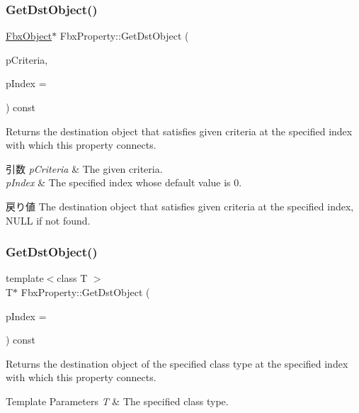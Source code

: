 \subsubsection{\texorpdfstring{Get\+Dst\+Object()}{GetDstObject()}\hspace{0.1cm}{\footnotesize\ttfamily [2/4]}}
{\footnotesize\ttfamily \hyperlink{class_fbx_object}{Fbx\+Object}$\ast$ Fbx\+Property\+::\+Get\+Dst\+Object (\begin{DoxyParamCaption}\item[{const \hyperlink{class_fbx_criteria}{Fbx\+Criteria} \&}]{p\+Criteria,  }\item[{const int}]{p\+Index = {} }\end{DoxyParamCaption}) const}

Returns the destination object that satisfies given criteria at the specified index with which this property connects. 
\begin{DoxyParams}{引数}
{\em p\+Criteria} & The given criteria. \\
\hline
{\em p\+Index} & The specified index whose default value is 0. \\
\hline
\end{DoxyParams}
\begin{DoxyReturn}{戻り値}
The destination object that satisfies given criteria at the specified index, N\+U\+LL if not found. 
\end{DoxyReturn}
\mbox{\label{class_fbx_property_a97b492c1eb439a481dbea8f494b82a2e}} 
\subsubsection{\texorpdfstring{Get\+Dst\+Object()}{GetDstObject()}\hspace{0.1cm}{\footnotesize\ttfamily [3/4]}}
{\footnotesize\ttfamily template$<$class T $>$ \\
T$\ast$ Fbx\+Property\+::\+Get\+Dst\+Object (\begin{DoxyParamCaption}\item[{const int}]{p\+Index = {} }\end{DoxyParamCaption}) const}

Returns the destination object of the specified class type at the specified index with which this property connects. 
\begin{DoxyTemplParams}{Template Parameters}
{\em T} & The specified class type. \\
\hline
\end{DoxyTemplParams}

